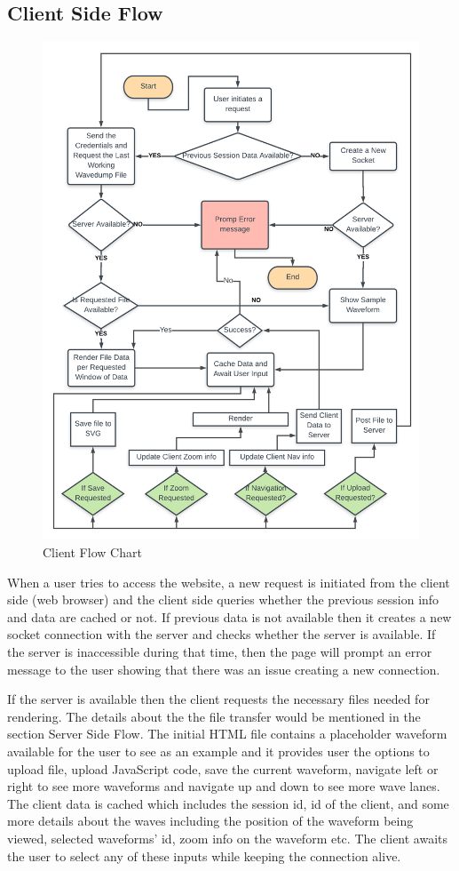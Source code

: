 \documentclass[14pt]{extarticle}
\begin{document}
\subsection{Client Side Flow}
\begin{figure}[H]
    \centering
    \includegraphics[scale=0.25]{client}
    \caption{Client Flow Chart}
    \label{fig:Client Flow Chart}
\end{figure}
\newpage
\par When a user tries to access the website, a new request is initiated from the client side (web browser) and the client side queries whether the previous session info and data are cached or not. If previous data is not available then it creates a new socket connection with the server and checks whether the server is available. If the server is inaccessible during that time, then the page will prompt an error message to the user showing that there was an issue creating a new connection.
\par If the server is available then the client requests the necessary files needed for rendering. The details about the the file transfer would be mentioned in the section Server Side Flow. The initial HTML file contains a placeholder waveform available for the user to see as an example and it provides user the options to upload file, upload JavaScript code, save the current waveform, navigate left or right to see more waveforms and navigate up and down to see more wave lanes. The client data is cached which includes the session id, id of the client, and some more details about the waves including the position of the waveform being viewed, selected waveforms' id, zoom info on the waveform etc. The client awaits the user to select any of these inputs while keeping the connection alive. 
\end{document}
